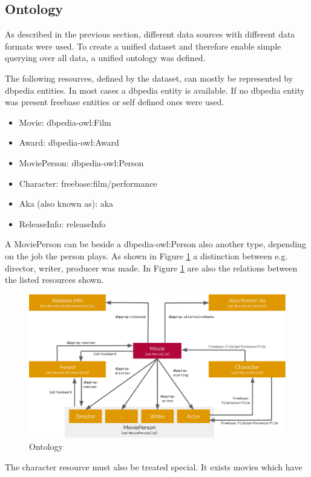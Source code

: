 \subsection{Ontology}
\label{subsec_method_ontology}

As described in the previous section, different data sources with different data formats were used. 
To create a unified dataset and therefore enable simple querying over all data, a unified ontology was defined.


The following resources, defined by the dataset, can mostly be represented by dbpedia entities. 
In most cases a dbpedia entity is available.
If no dbpedia entity was present freebase entities or self defined ones were used.

\begin{itemize}
\item Movie: dbpedia-owl:Film
\item Award: dbpedia-owl:Award
\item MoviePerson: dbpedia-owl:Person
\item Character: freebase:film/performance
\item Aka (also known as): aka
\item ReleaseInfo: releaseInfo

\end{itemize}

A MoviePerson can be beside a dbpedia-owl:Person also another type, depending on the job the person plays. 
As shown in Figure \ref{fig_ontology} a distinction between e.g. director, writer, producer was made.
In Figure \ref{fig_ontology} are also the relations between the listed resources shown.



\begin{figure}[h!]
\includegraphics[width=\textwidth]{images/ontology.pdf}
\caption{Ontology}
\label{fig_ontology}
\end{figure}

The character resource must also be treated special. It exists movies which have




